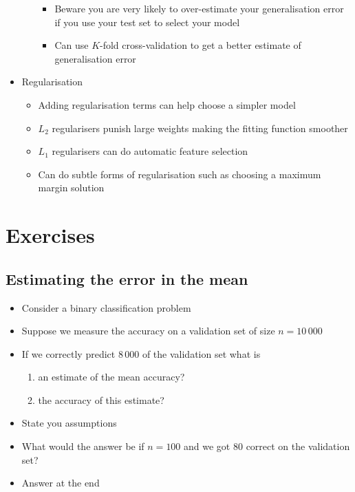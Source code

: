 \documentclass[11pt]{article}
\begin{document}
\begin{itemize}
\begin{itemize}
\begin{itemize}
\item Beware you are very likely to over-estimate your generalisation error
if you use your test set  to select your model
\item Can use \(K\)-fold cross-validation to get a better estimate of
generalisation error
\end{itemize}
\end{itemize}
\item Regularisation
\begin{itemize}
\item Adding regularisation terms can help choose a simpler model
\item \(L_2\) regularisers punish large weights making the fitting
function smoother
\item \(L_1\) regularisers can do automatic feature selection
\item Can do subtle forms of regularisation such as choosing a maximum
margin solution
\end{itemize}
\end{itemize}

\section{Exercises}
\label{sec:orgf4f8de1}

\subsection{Estimating the error in the mean}
\label{sec:org5db03f0}

\begin{itemize}
\item Consider a binary classification problem
\item Suppose we measure the accuracy on a validation set of size \(n=10\,000\)
\item If we correctly predict \(8\,000\) of the validation set what is
\begin{enumerate}
\item an estimate of the mean accuracy?
\item the accuracy of this estimate?
\end{enumerate}
\item State you assumptions
\item What would the answer be if \(n=100\) and we got 80 correct on 
the validation set?
\item Answer at the end
\end{itemize}
\end{document}
